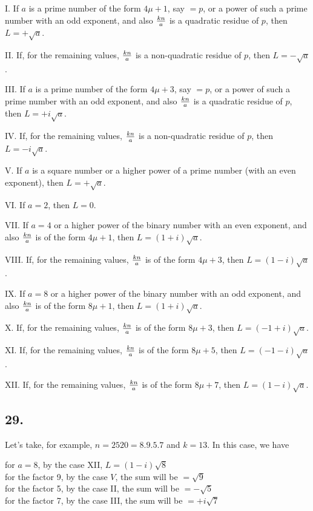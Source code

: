 \documentclass[twoside,12pt, showframe]{memoir}
\renewenvironment{quote}%
  {\list{}{\leftmargin=5em\rightmargin=0em}\item[]}%
  {\endlist}
\let\oldfrac\frac
\def\frac#1#2{\mathchoice{\tfrac{#1}{#2}}{\oldfrac{#1}{#2}}{\genfrac{}{}{}{2}{#1}{#2\mathstrut}}{\genfrac{}{}{}{3}{#1}{#2\mathstrut}}}
\begin{document}
I. If \(a\) is a prime number of the form \(4 \mu+1\), say \(=p\), or a power of such a prime number with an odd exponent, and also \(\frac{k n}{a}\) is a quadratic residue of \(p\), then \(L=+\sqrt{a}\).

II. If, for the remaining values, \(\frac{k n}{a}\) is a non-quadratic residue of \(p\), then \(L=-\sqrt{a}\).

III. If \(a\) is a prime number of the form \(4 \mu+3\), say \(=p\), or a power of such a prime number with an odd exponent, and also \(\frac{k n}{a}\) is a quadratic residue of \(p\), then \(L=+i \sqrt{a}\).

IV. If, for the remaining values, \(\frac{k n}{a}\) is a non-quadratic residue of \(p\), then \(L=-i \sqrt{a}\).

V. If \(a\) is a square number or a higher power of a prime number (with an even exponent), then \(L=+\sqrt{a}\).

VI. If \(a=2\), then \(L=0\).

VII. If \(a=4\) or a higher power of the binary number with an even exponent, and also \(\frac{k n}{a}\) is of the form \(4 \mu+1\), then \(L=(1+i) \sqrt{a}\).

VIII. If, for the remaining values, \(\frac{k n}{a}\) is of the form \(4 \mu+3\), then \(L=(1-i) \sqrt{a}\).

IX. If \(a=8\) or a higher power of the binary number with an odd exponent, and also \(\frac{k n}{a}\) is of the form \(8 \mu+1\), then \(L=(1+i) \sqrt{a}\).

X. If, for the remaining values, \(\frac{k n}{a}\) is of the form \(8 \mu+3\), then \(L=(-1+i) \sqrt{a}\).

XI. If, for the remaining values, \(\frac{k n}{a}\) is of the form \(8 \mu+5\), then \(L=(-1-i) \sqrt{a}\).

XII. If, for the remaining values, \(\frac{k n}{a}\) is of the form \(8 \mu+7\), then \(L=(1-i) \sqrt{a}\).
%

\subsection*{29.}

Let's take, for example, \(n=2520=8 . 9 . 5 . 7\) and \(k=13\). In this case, we have
\begin{quote}for \(a=8\), by the case XII, \(L=(1-i) \sqrt{8}\)\\
for the factor 9, by the case \(V\), the sum will be \(=\sqrt{9}\)\\
for the factor 5, by the case II, the sum will be \(=-\sqrt{5}\)\\
for the factor 7, by the case III, the sum will be \(=+i \sqrt{7}\)
\end{quote}
\end{document}
